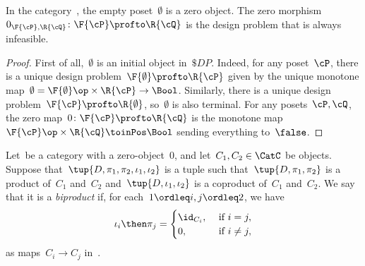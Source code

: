 \begin{lemma}
  In the category~\DP, the empty poset~$\emptyset$ is a zero object. The zero morphism~$0_{\F{\cP},\R{\cQ}}\colon \F{\cP} \profto \R{\cQ}$ is the design problem that is always infeasible.
\end{lemma}
\begin{proof}
  First of all,~$\emptyset$ is an initial object in~$\$DP$. Indeed, for any poset~$\cP $, there is a unique design problem~$\F{\emptyset} \profto \R{\cP}$ given by the unique monotone map~$\emptyset=\F{\emptyset}\op\times \R{\cP} \to\Bool$. Similarly, there is a unique design problem~$\F{\cP} \profto \R{\emptyset}$, so~$\emptyset$ is also terminal. For any posets~$\cP ,\cQ$, the zero map~$0 \colon \F{\cP} \profto \R{\cQ}$ is the monotone map~$\F{\cP} \op\times \R{\cQ} \toinPos \Bool$ sending everything to~$\false$.
\end{proof}

\begin{ctdefinition}[Biproduct]
  Let~\CatC be a category with a zero-object~$0$, and let~$C_1,C_2\in\CatC$ be objects. Suppose that~$\tup{D,\pi_1,\pi_2,\iota_1,\iota_2}$ is a tuple such that~$\tup{D,\pi_1,\pi_2}$ is a product of~$C_1$ and~$C_2$ and~$\tup{D,\iota_1,\iota_2}$ is a coproduct of~$C_1$ and~$C_2$. We say that it is a \emph{biproduct} if, for each~$1\ordleq i,j\ordleq 2$, we have
  \begin{equation}
    \iota_i\then \pi_j=
    \begin{cases}
      \id_{C_i}, &\text{ if }i=j,\\
      0, &\text{ if }i\neq j,
    \end{cases} \label{eq:biproduct-condition}
  \end{equation}
  as maps~$C_i\to C_j$ in~\CatC.
\end{ctdefinition}


